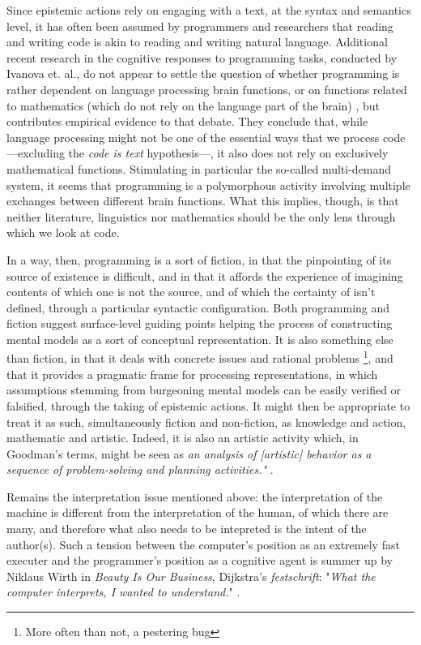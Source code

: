 Since epistemic actions rely on engaging with a text, at the syntax and semantics level, it has often been assumed by programmers and researchers that reading and writing code is akin to reading and writing natural language. Additional recent research in the cognitive responses to programming tasks, conducted by Ivanova et. al., do not appear to settle the question of whether programming is rather dependent on language processing brain functions, or on functions related to mathematics (which do not rely on the language part of the brain) \citep{ivanova_comprehension_2020}, but contributes empirical evidence to that debate. They conclude that, while language processing might not be one of the essential ways that we process code—excluding the \emph{code is text} hypothesis—, it also does not rely on exclusively mathematical functions. Stimulating in particular the so-called multi-demand system, it seems that programming is a polymorphous activity involving multiple exchanges between different brain functions. What this implies, though, is that neither literature, linguistics nor mathematics should be the only lens through which we look at code.

\spacersmall

In a way, then, programming is a sort of fiction, in that the pinpointing of its source of existence is difficult, and in that it affords the experience of imagining contents of which one is not the source, and of which the certainty of isn't defined, through a particular syntactic configuration. Both programming and fiction suggest surface-level guiding points helping the process of constructing mental models as a sort of conceptual representation. It is also something else than fiction, in that it deals with concrete issues and rational problems \footnote{More often than not, a pestering bug}, and that it provides a pragmatic frame for processing representations, in which assumptions stemming from burgeoning mental models can be easily verified or falsified, through the taking of epistemic actions. It might then be appropriate to treat it as such, simultaneously fiction and non-fiction, as knowledge and action, mathematic and artistic. Indeed, it is also an artistic activity which, in Goodman's terms, might be seen as \emph{an analysis of [artistic] behavior as a sequence of problem-solving and planning activities."} \citep{goodman_basic_1972}.

Remains the interpretation issue mentioned above: the interpretation of the machine is different from the interpretation of the human, of which there are many, and therefore what also needs to be intepreted is the intent of the author(s). Such a tension between the computer's position as an extremely fast executer and the programmer's position as a cognitive agent is summer up by Niklaus Wirth in \emph{Beauty Is Our Business}, Dijkstra's \emph{festschrift}: "\emph{What the computer interprets, I wanted to understand.}" \citep{wirth_drawing_1990}.

